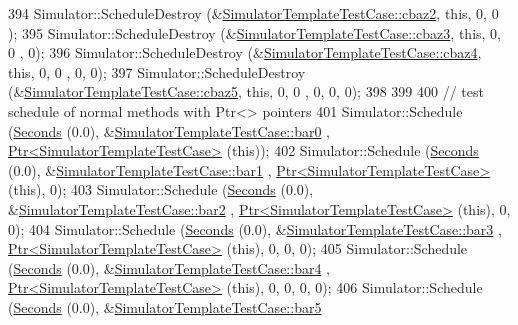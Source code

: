 \begin{DoxyCode}
394   Simulator::ScheduleDestroy (&\hyperlink{classSimulatorTemplateTestCase_a0e58a1e62ebad4e4d0717cc64075c496}{SimulatorTemplateTestCase::cbaz2}, \textcolor{keyword}{this}, 0, 0
      );
395   Simulator::ScheduleDestroy (&\hyperlink{classSimulatorTemplateTestCase_a89bc22b2a32d6cdf026e8f7209a2fbbd}{SimulatorTemplateTestCase::cbaz3}, \textcolor{keyword}{this}, 0, 0
      , 0);
396   Simulator::ScheduleDestroy (&\hyperlink{classSimulatorTemplateTestCase_ac464eb9dcde4c15e5f63e9ae61fbc5a7}{SimulatorTemplateTestCase::cbaz4}, \textcolor{keyword}{this}, 0, 0
      , 0, 0);
397   Simulator::ScheduleDestroy (&\hyperlink{classSimulatorTemplateTestCase_a68c3789ba056bcddf5f1575d4c9c0548}{SimulatorTemplateTestCase::cbaz5}, \textcolor{keyword}{this}, 0, 0
      , 0, 0, 0);
398 
399 
400   \textcolor{comment}{// test schedule of normal methods with Ptr<> pointers}
401   Simulator::Schedule (\hyperlink{group__timecivil_ga33c34b816f8ff6628e33d5c8e9713b9e}{Seconds} (0.0), &\hyperlink{classSimulatorTemplateTestCase_a7c53480e1b906bfeaea5e0070ff5cc0c}{SimulatorTemplateTestCase::bar0}
      , \hyperlink{classns3_1_1Ptr}{Ptr<SimulatorTemplateTestCase>} (\textcolor{keyword}{this}));
402   Simulator::Schedule (\hyperlink{group__timecivil_ga33c34b816f8ff6628e33d5c8e9713b9e}{Seconds} (0.0), &\hyperlink{classSimulatorTemplateTestCase_a83631fe15f6b4aaffcf702e71a664205}{SimulatorTemplateTestCase::bar1}
      , \hyperlink{classns3_1_1Ptr}{Ptr<SimulatorTemplateTestCase>} (\textcolor{keyword}{this}), 0);
403   Simulator::Schedule (\hyperlink{group__timecivil_ga33c34b816f8ff6628e33d5c8e9713b9e}{Seconds} (0.0), &\hyperlink{classSimulatorTemplateTestCase_a0a416b76615bb0e90f1312694f09133b}{SimulatorTemplateTestCase::bar2}
      , \hyperlink{classns3_1_1Ptr}{Ptr<SimulatorTemplateTestCase>} (\textcolor{keyword}{this}), 0, 0);
404   Simulator::Schedule (\hyperlink{group__timecivil_ga33c34b816f8ff6628e33d5c8e9713b9e}{Seconds} (0.0), &\hyperlink{classSimulatorTemplateTestCase_aea52cc1b6dabac3782131bc96f7e3556}{SimulatorTemplateTestCase::bar3}
      , \hyperlink{classns3_1_1Ptr}{Ptr<SimulatorTemplateTestCase>} (\textcolor{keyword}{this}), 0, 0, 0);
405   Simulator::Schedule (\hyperlink{group__timecivil_ga33c34b816f8ff6628e33d5c8e9713b9e}{Seconds} (0.0), &\hyperlink{classSimulatorTemplateTestCase_a0a46a38ced46c32a980d1458f23f26ac}{SimulatorTemplateTestCase::bar4}
      , \hyperlink{classns3_1_1Ptr}{Ptr<SimulatorTemplateTestCase>} (\textcolor{keyword}{this}), 0, 0, 0, 0);
406   Simulator::Schedule (\hyperlink{group__timecivil_ga33c34b816f8ff6628e33d5c8e9713b9e}{Seconds} (0.0), &\hyperlink{classSimulatorTemplateTestCase_a75066b2e82301377dddc07d887c96853}{SimulatorTemplateTestCase::bar5}

\end{DoxyCode}
